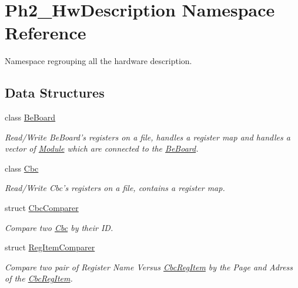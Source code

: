 \hypertarget{namespace_ph2___hw_description}{
\section{Ph2\_\-Hw\-Description Namespace Reference}
\label{namespace_ph2___hw_description}
}
Namespace regrouping all the hardware description.  


\subsection*{Data Structures}
\begin{CompactItemize}
\item 
class \hyperlink{class_ph2___hw_description_1_1_be_board}{Be\-Board}
\begin{CompactList}\small\item\em Read/Write Be\-Board's registers on a file, handles a register map and handles a vector of \hyperlink{class_ph2___hw_description_1_1_module}{Module} which are connected to the \hyperlink{class_ph2___hw_description_1_1_be_board}{Be\-Board}. \item\end{CompactList}\item 
class \hyperlink{class_ph2___hw_description_1_1_cbc}{Cbc}
\begin{CompactList}\small\item\em Read/Write Cbc's registers on a file, contains a register map. \item\end{CompactList}\item 
struct \hyperlink{struct_ph2___hw_description_1_1_cbc_comparer}{Cbc\-Comparer}
\begin{CompactList}\small\item\em Compare two \hyperlink{class_ph2___hw_description_1_1_cbc}{Cbc} by their ID. \item\end{CompactList}\item 
struct \hyperlink{struct_ph2___hw_description_1_1_reg_item_comparer}{Reg\-Item\-Comparer}
\begin{CompactList}\small\item\em Compare two pair of Register Name Versus \hyperlink{struct_ph2___hw_description_1_1_cbc_reg_item}{Cbc\-Reg\-Item} by the Page and Adress of the \hyperlink{struct_ph2___hw_description_1_1_cbc_reg_item}{Cbc\-Reg\-Item}. \item\end{CompactList}\item 

\end{CompactItemize}
